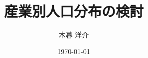 \documentclass[12pt,a4paper]{ltjsarticle}
\title{\bfseries 産業別人口分布の検討}
\author{木暮 洋介}
\date{\today}
\begin{document}
\maketitle
\onehalfspacing



\cite{akamatsu2017discrete}

\cite{sugimoto2022chiiki}

\clearpage


\end{document}
